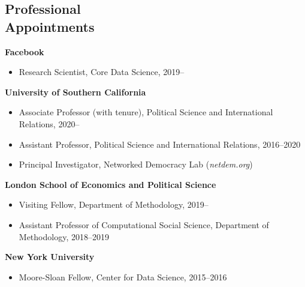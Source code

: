\documentclass[margin,line,11pt]{resume}
\begin{document}
\begin{resume}
    \section{\mysidestyle Professional\\Appointments}
    \textbf{Facebook}
    \begin{itemize}
    \item[] Research Scientist, Core Data Science, 2019--
    \end{itemize}
    \vspace{-.15cm}      
    \textbf{University of Southern California}
    \begin{itemize}
    \item[] Associate Professor (with tenure), Political Science and International Relations, 2020--
    \vspace{-.15cm}    
    \item[] Assistant Professor, Political Science and International Relations, 2016--2020
    \vspace{-.15cm}
    \item[] Principal Investigator, Networked Democracy Lab (\textit{netdem.org})
    \end{itemize}    
    \vspace{-.15cm}
    \textbf{London School of Economics and Political Science}
    \begin{itemize}
    \item[] Visiting Fellow, Department of Methodology, 2019--
    \vspace{-.15cm}    
    \item[] Assistant Professor of Computational Social Science, Department of Methodology, 2018--2019
    \end{itemize}
    \vspace{-.30cm}
    \textbf{New York University}
    \begin{itemize}
    \item[] Moore-Sloan Fellow, Center for Data Science, 2015--2016
    \end{itemize}
        

\end{resume}
\end{document}
